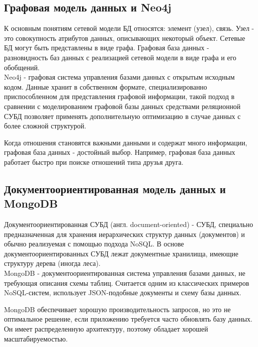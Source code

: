 \subsection*{Графовая модель данных и Neo4j}

К основным понятиям сетевой модели БД относятся: элемент (узел), связь. Узел - это совокупность атрибутов данных,
описывающих некоторый объект. Сетевые БД могут быть представлены в виде графа.
Графовая база данных - разновидность баз данных с реализацией сетевой модели в виде графа и его обобщений. 
\\

Neo4j - графовая система управления базами данных с открытым исходным кодом.
Данные хранит в собственном формате, специализированно приспособленном для представления графовой информации, такой подход в сравнении с моделированием графовой базы данных средствами реляционной СУБД позволяет применять дополнительную оптимизацию в случае данных с более сложной структурой.

Когда отношения становятся важными данными и содержат много информации, графовая база данных - достойный выбор. Например, графовая база данных работает быстро при поиске отношений типа друзья друга.


\subsection*{Документоориентированная модель данных и MongoDB}

Документоориентированная СУБД (англ. document-oriented) - СУБД, специально предназначенная для хранения иерархических структур данных (документов) и обычно реализуемая с помощью подхода NoSQL.
В основе документоориентированных СУБД лежат документные хранилища, имеющие структуру дерева (иногда леса).
\\

MongoDB - документоориентированная система управления базами данных, не требующая описания схемы таблиц.
Считается одним из классических примеров NoSQL-систем, использует JSON-подобные документы и схему базы данных.

MongoDB обеспечивает хорошую производительность запросов, но это не оптимальное решение, если приложению требуется часто обновлять базу данных. Он имеет распределенную архитектуру, поэтому обладает хорошей масштабируемостью.




